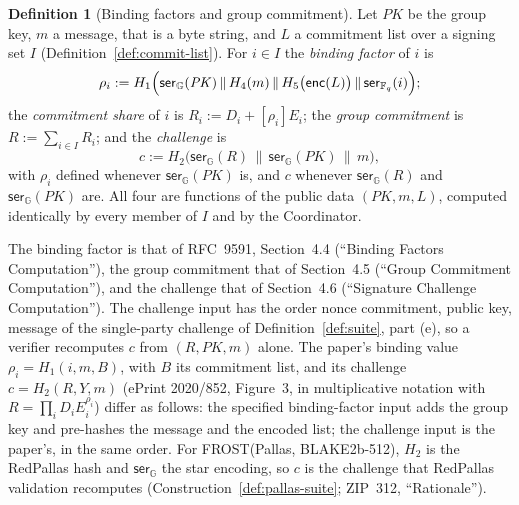 \documentclass[11pt,a4paper]{article}
\theoremstyle{definition}
\newtheorem{definition}[theorem]{Definition}
\newcommand{\F}{\mathbb{F}}
\newcommand{\G}{\mathbb{G}}
\newcommand{\Fq}{\F_q}
\begin{document}
\begin{definition}[Binding factors and group commitment]\label{def:binding}
Let \(\mathit{PK}\) be the group key, \(m\) a message, that is a byte
string, and \(L\) a commitment list over a signing set \(I\)
(Definition~\ref{def:commit-list}). For \(i \in I\) the \emph{binding
factor} of \(i\) is
\[
  \rho_i := H_1\Bigl( \mathsf{ser}_{\G}(\mathit{PK}) \,\|\, H_4(m) \,\|\,
    H_5\bigl(\mathsf{enc}(L)\bigr) \,\|\, \mathsf{ser}_{\Fq}(i) \Bigr) ;
\]
the \emph{commitment share} of \(i\) is \(R_i := D_i + [\rho_i]E_i\); the
\emph{group commitment} is \(R := \sum_{i \in I} R_i\); and the
\emph{challenge} is
\[
  c := H_2\bigl( \mathsf{ser}_{\G}(R) \,\|\, \mathsf{ser}_{\G}(\mathit{PK})
    \,\|\, m \bigr) ,
\]
with \(\rho_i\) defined whenever \(\mathsf{ser}_{\G}(\mathit{PK})\) is, and
\(c\) whenever \(\mathsf{ser}_{\G}(R)\) and \(\mathsf{ser}_{\G}(\mathit{PK})\)
are. All four are functions of
the public data \((\mathit{PK}, m, L)\), computed identically by every
member of \(I\) and by the Coordinator.
\end{definition}

The binding factor is that of RFC~9591, Section~4.4 (``Binding Factors
Computation''), the group commitment that of Section~4.5 (``Group
Commitment Computation''), and the challenge that of Section~4.6
(``Signature Challenge Computation''). The challenge input has the order
nonce commitment, public key, message of the single-party challenge of
Definition~\ref{def:suite}, part (e), so a verifier recomputes \(c\) from
\((R, \mathit{PK}, m)\) alone. The paper's binding value
\(\rho_i = H_1(i, m, B)\), with \(B\) its commitment list, and its
challenge \(c = H_2(R, Y, m)\) (ePrint 2020/852, Figure~3, in
multiplicative notation with \(R = \prod_i D_i E_i^{\rho_i}\)) differ as
follows: the specified binding-factor input adds the group key and
pre-hashes the message and the encoded list; the challenge input is the
paper's, in the same order. For FROST(Pallas, BLAKE2b-512), \(H_2\) is the
RedPallas hash and \(\mathsf{ser}_{\G}\) the star encoding, so \(c\) is the
challenge that RedPallas validation recomputes
(Construction~\ref{def:pallas-suite}; ZIP~312, ``Rationale'').
\end{document}
